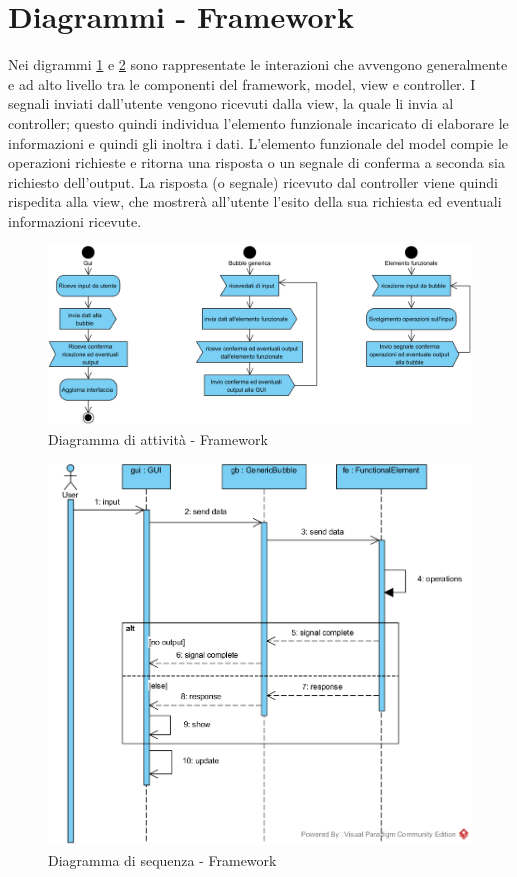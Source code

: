 \section{Diagrammi - Framework}

Nei digrammi \ref{fig:alt_framework} e \ref{fig:seq_framework} sono rappresentate le interazioni che avvengono generalmente e ad alto
livello tra le componenti del framework, model, view e controller. I segnali inviati dall’utente
vengono ricevuti dalla view, la quale li invia al controller; questo quindi individua l’elemento
funzionale incaricato di elaborare le informazioni e quindi gli inoltra i dati. L’elemento funzionale
del model compie le operazioni richieste e ritorna una risposta o un segnale di conferma a seconda
sia richiesto dell’output. La risposta (o segnale) ricevuto dal controller viene quindi rispedita
alla view, che mostrerà all’utente l’esito della sua richiesta ed eventuali informazioni ricevute.

\begin{figure}[H]
	\centering
	\includegraphics[width=14cm]{diagrammi_img/attivita/framework.png}
	\caption{Diagramma di attività - Framework}
	\label{fig:alt_framework}
\end{figure}

\begin{figure}[H]
	\centering
	\includegraphics[width=14cm]{diagrammi_img/sequenza/framework.png}
	\caption{Diagramma di sequenza - Framework}
	\label{fig:seq_framework}
\end{figure}

